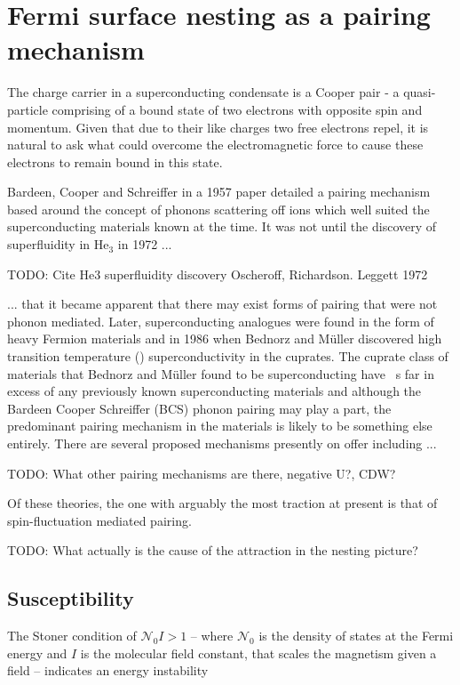 
\section{Fermi surface nesting as a pairing mechanism}

The charge carrier in a superconducting condensate is a Cooper pair - a quasi-particle comprising of a bound state of two electrons with opposite spin and momentum. Given that due to their like charges two free electrons repel, it is natural to ask what could overcome the electromagnetic force to cause these electrons to remain bound in this state.

Bardeen, Cooper and Schreiffer in a 1957 paper\cite{Bardeen1957} detailed a pairing mechanism based around the concept of phonons scattering off ions which well suited the superconducting materials known at the time. It was not until the discovery of superfluidity in He$_3$ in 1972 ...

TODO: Cite He3 superfluidity discovery Oscheroff, Richardson. Leggett 1972

... that it became apparent that there may exist forms of pairing that were not phonon mediated. Later, superconducting analogues were found in the form of heavy Fermion materials and in 1986 when Bednorz and M\"uller\cite{Bednorz} discovered high transition temperature (\Tc) superconductivity in the cuprates. The cuprate class of materials that Bednorz and M\"uller found to be superconducting have \Tc~s far in excess of any previously known superconducting materials and although the Bardeen Cooper Schreiffer (BCS) phonon pairing may play a part, the predominant pairing mechanism in the \highTc materials is likely to be something else entirely\cite{Mazin2008}. There are several proposed mechanisms presently on offer including ...

TODO: What other pairing mechanisms are there, negative U?, CDW?

Of these theories, the one with arguably the most traction at present is that of spin-fluctuation mediated pairing. 

TODO: What actually is the cause of the attraction in the nesting picture?






\subsection{Susceptibility}

The Stoner condition of $\mathcal{N}_0 I > 1$ -- where $\mathcal{N}_0$ is the density of states at the Fermi energy and $I$ is the molecular field constant, that scales the magnetism given a field -- indicates an energy instability\cite{Kubler2000}

